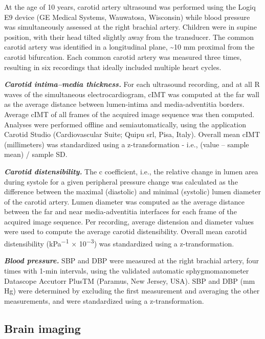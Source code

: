 \documentclass[
  letterpaper,
  DIV=11,
  numbers=noendperiod]{scrreport}
\begin{document}
At the age of 10 years, carotid artery ultrasound was performed using
the Logiq E9 device (GE Medical Systems, Wauwatosa, Wisconsin) while
blood pressure was simultaneously assessed at the right brachial artery.
Children were in supine position, with their head tilted slightly away
from the transducer. The common carotid artery was identified in a
longitudinal plane, \textasciitilde10 mm proximal from the carotid
bifurcation. Each common carotid artery was measured three times,
resulting in six recordings that ideally included multiple heart cycles.

\textbf{\emph{Carotid intima--media thickness.}} For each ultrasound
recording, and at all R waves of the simultaneous electrocardiogram,
cIMT was computed at the far wall as the average distance between
lumen-intima and media-adventitia borders. Average cIMT of all frames of
the acquired image sequence was then computed. Analyses were performed
offline and semiautomatically, using the application Carotid Studio
(Cardiovascular Suite; Quipu srl, Pisa, Italy). Overall mean cIMT
(millimeters) was standardized using a z-transformation - i.e., (value
-- sample mean) / sample SD.

\textbf{\emph{Carotid distensibility.}} The c coefficient, i.e., the
relative change in lumen area during systole for a given peripheral
pressure change was calculated as the difference between the maximal
(diastolic) and minimal (systolic) lumen diameter of the carotid artery.
Lumen diameter was computed as the average distance between the far and
near media-adventitia interfaces for each frame of the acquired image
sequence. Per recording, average distension and diameter values were
used to compute the average carotid distensibility. Overall mean carotid
distensibility (kPa\textsuperscript{−1} × 10\textsuperscript{−3}) was
standardized using a z-transformation.

\textbf{\emph{Blood pressure.}} SBP and DBP were measured at the right
brachial artery, four times with 1-min intervals, using the validated
automatic sphygmomanometer Datascope Accutorr PlusTM (Paramus, New
Jersey, USA). SBP and DBP (mm Hg) were determined by excluding the first
measurement and averaging the other measurements, and were standardized
using a z-transformation.

\subsection{Brain imaging}\label{brain-imaging}
\end{document}
